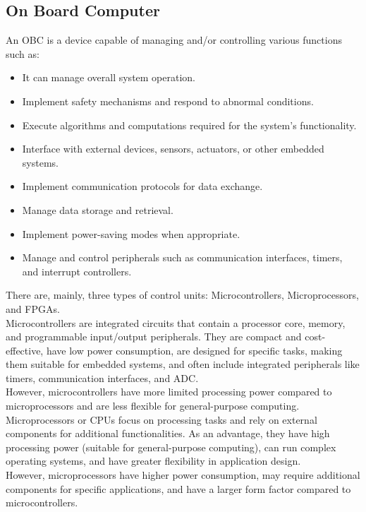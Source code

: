 \subsection{On Board Computer}
An \gls{OBC} is a device capable of managing and/or controlling various functions such as:
\begin{itemize}
    \item It can manage overall system operation.
    \item Implement safety mechanisms and respond to abnormal conditions.
    \item Execute algorithms and computations required for the system's functionality.
    \item Interface with external devices, sensors, actuators, or other embedded systems.
    \item Implement communication protocols for data exchange.
    \item Manage data storage and retrieval.
    \item Implement power-saving modes when appropriate.
    \item Manage and control peripherals such as communication interfaces, timers, and interrupt controllers.
\end{itemize}

There are, mainly, three types of control units: Microcontrollers, Microprocessors, and \glspl{FPGA}.\\
Microcontrollers are integrated circuits that contain a processor core, memory, and programmable input/output peripherals.
They are compact and cost-effective, have low power consumption, are designed for specific tasks, making them suitable for embedded systems, and often include integrated peripherals like timers, communication interfaces, and ADC.\\
However, microcontrollers have more limited processing power compared to microprocessors and are less flexible for general-purpose computing.\\

Microprocessors or \glspl{CPU} focus on processing tasks and rely on external components for additional functionalities.
As an advantage, they have high processing power (suitable for general-purpose computing), can run complex operating systems, and have greater flexibility in application design.\\
However, microprocessors have higher power consumption, may require additional components for specific applications, and have a larger form factor compared to microcontrollers.\\

